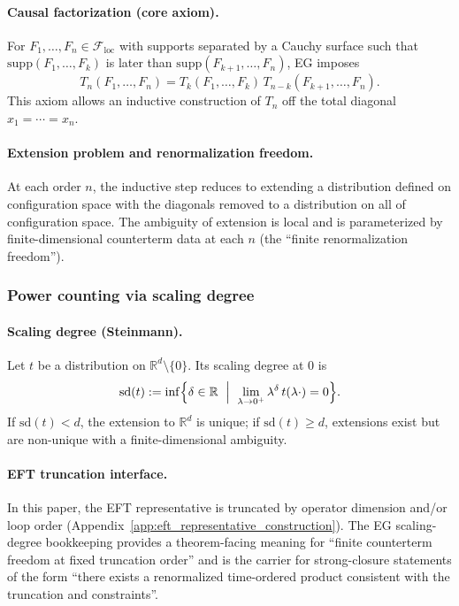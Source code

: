 \paragraph{Causal factorization (core axiom).}
For $F_1,\ldots,F_n\in\mathcal{F}_{\mathrm{loc}}$ with supports separated by a Cauchy surface such that $\mathrm{supp}(F_1,\ldots,F_k)$ is later than $\mathrm{supp}(F_{k+1},\ldots,F_n)$, EG imposes
\[
T_n(F_1,\ldots,F_n)=T_k(F_1,\ldots,F_k)\,T_{n-k}(F_{k+1},\ldots,F_n).
\]
This axiom allows an inductive construction of $T_n$ off the total diagonal $x_1=\cdots=x_n$.

\paragraph{Extension problem and renormalization freedom.}
At each order $n$, the inductive step reduces to extending a distribution defined on configuration space with the diagonals removed to a distribution on all of configuration space.
The ambiguity of extension is local and is parameterized by finite-dimensional counterterm data at each $n$ (the ``finite renormalization freedom'').

\subsubsection{Power counting via scaling degree}
\paragraph{Scaling degree (Steinmann).}
Let $t$ be a distribution on $\mathbb{R}^d\setminus\{0\}$.
Its scaling degree at $0$ is
\[
\mathrm{sd}(t):=\inf\Bigl\{\delta\in\mathbb{R}\ \Bigm|\ \lim_{\lambda\to 0^+}\lambda^\delta\, t(\lambda \cdot)=0\Bigr\}.
\]
If $\mathrm{sd}(t)<d$, the extension to $\mathbb{R}^d$ is unique; if $\mathrm{sd}(t)\ge d$, extensions exist but are non-unique with a finite-dimensional ambiguity.

\paragraph{EFT truncation interface.}
\InterfaceTag In this paper, the EFT representative is truncated by operator dimension and/or loop order (Appendix~\ref{app:eft_representative_construction}).
The EG scaling-degree bookkeeping provides a theorem-facing meaning for ``finite counterterm freedom at fixed truncation order'' and is the carrier for strong-closure statements of the form ``there exists a renormalized time-ordered product consistent with the truncation and constraints''.

